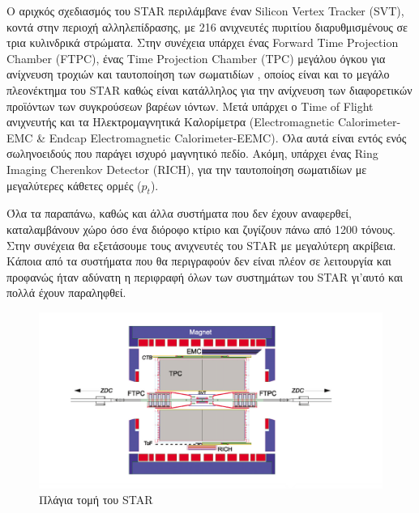 	
	Ο αριχκός σχεδιασμός του STAR περιλάμβανε έναν Silicon Vertex Tracker (SVT), κοντά στην περιοχή αλληλεπίδρασης, με 216 ανιχνευτές πυριτίου διαρυθμισμένους σε τρια κυλινδρικά στρώματα. Στην συνέχεια υπάρχει ένας Forward Time Projection Chamber (FTPC), ένας Time Projection Chamber (TPC) μεγάλου όγκου για ανίχνευση τροχιών και ταυτοποίηση των σωματιδίων , οποίος είναι και το μεγάλο πλεονέκτημα του STAR καθώς είναι κατάλληλος για την ανίχνευση των διαφορετικών προϊόντων των συγκρούσεων βαρέων ιόντων. Μετά υπάρχει ο Time of Flight ανιχνευτής και τα Ηλεκτρομαγνητικά Καλορίμετρα (Electromagnetic Calorimeter-EMC \& Endcap Electromagnetic Calorimeter-EEMC). Όλα αυτά είναι εντός ενός σωληνοειδούς που παράγει ισχυρό μαγνητικό πεδίο. Aκόμη, υπάρχει ένας Ring Imaging Cherenkov  Detector (RICH), για την ταυτοποίηση σωματιδίων με μεγαλύτερες κάθετες ορμές ($p_t$).%
	
	Όλα τα παραπάνω, καθώς και άλλα συστήματα που δεν έχουν αναφερθεί, καταλαμβάνουν χώρο όσο ένα διόροφο κτίριο και ζυγίζουν πάνω από 1200 τόνους.
	Στην συνέχεια θα εξετάσουμε τους ανιχνευτές του STAR με μεγαλύτερη ακρίβεια. Κάποια από τα συστήματα που θα περιγραφούν δεν είναι πλέον σε λειτουργία και προφανώς ήταν αδύνατη η περιφραφή όλων των συστημάτων του STAR γι'αυτό και πολλά έχουν παραληφθεί.
	
	\begin{figure}[h!]
		\centering
		\includegraphics[scale=0.6]{STAR_Detectors/Cutway_Star_2001}
		\caption{Πλάγια τομή του STAR}
		\label{fig3}
	\end{figure}